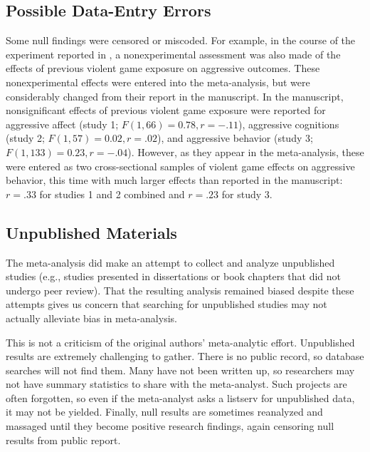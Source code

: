 \documentclass[man]{apa6}
\begin{document}
\subsection{Possible Data-Entry Errors}
Some null findings were censored or miscoded. %
For example, in the course of the experiment reported in \citet{Carnagey:Anderson:2005}, a nonexperimental assessment was also made of the effects of previous violent game exposure on aggressive outcomes. These nonexperimental effects were entered into the \citet{Anderson:etal:2010} meta-analysis, but were considerably changed from their report in the \citet{Carnagey:Anderson:2005} manuscript.  In the manuscript, nonsignificant effects of previous violent game exposure were reported for aggressive affect (study 1; $F(1, 66) = 0.78, r = -.11$), aggressive cognitions (study 2; $F(1, 57) = 0.02, r = .02$), and aggressive behavior (study 3; $F(1, 133) = 0.23, r = -.04$). However, as they appear in the meta-analysis, these were entered as two cross-sectional samples of violent game effects on aggressive behavior, this time with much larger effects than reported in the manuscript: $r = .33$ for studies 1 and 2 combined and $r = .23$ for study 3.

\subsection{Unpublished Materials}
The \citep{Anderson:etal:2010} meta-analysis did make an attempt to collect and analyze unpublished studies (e.g., studies presented in dissertations or book chapters that did not undergo peer review). That the resulting analysis remained biased despite these attempts gives us concern that searching for unpublished studies may not actually alleviate bias in meta-analysis. 

This is not a criticism of the original authors' meta-analytic effort. Unpublished results are extremely challenging to gather. There is no public record, so database searches will not find them. Many have not been written up, so researchers may not have summary statistics to share with the meta-analyst. Such projects are often forgotten, so even if the meta-analyst asks a listserv for unpublished data, it may not be yielded. Finally, null results are sometimes reanalyzed and massaged until they become positive research findings, again censoring null results from public report.
\end{document}
